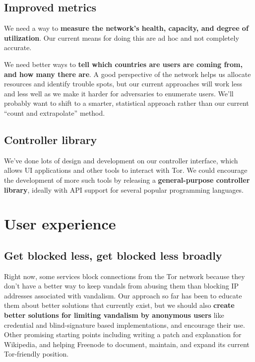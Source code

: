 \documentclass{article}
\newcommand{\tmp}[1]{{\bf #1} [......] \\}
\begin{document}
\subsection{Improved metrics}
We need a way to {\bf measure the network's health, capacity, and degree of
  utilization}.  Our current means for doing this are ad hoc and not
completely accurate.

We need better ways to {\bf tell which countries are users are coming from,
  and how many there are}.  A good perspective of the network helps us
allocate resources and identify trouble spots, but our current approaches
will work less and less well as we make it harder for adversaries to
enumerate users.  We'll probably want to shift to a smarter, statistical
approach rather than our current ``count and extrapolate'' method.


\subsection{Controller library}
We've done lots of design and development on our controller interface, which
allows UI applications and other tools to interact with Tor.  We could
encourage the development of more such tools by releasing a {\bf
  general-purpose controller library}, ideally with API support for several
popular programming languages.

\section{User experience}

\subsection{Get blocked less, get blocked less broadly}
Right now, some services block connections from the Tor network because
they don't have a better
way to keep vandals from abusing them than blocking IP addresses associated
with vandalism.  Our approach so far has been to educate them about better
solutions that currently exist, but we should also {\bf create better
solutions for limiting vandalism by anonymous users} like credential and
blind-signature based implementations, and encourage their use. Other
promising starting points including writing a patch and explanation for
Wikipedia, and helping Freenode to document, maintain, and expand its
current Tor-friendly position.
\end{document}
